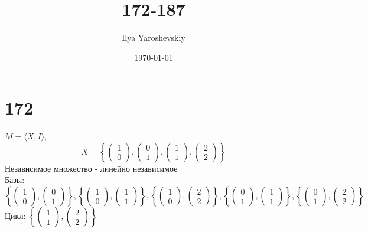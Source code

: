 \documentclass{article}
\author{Ilya Yaroshevskiy}
\date{\today}
\title{172-187}
\begin{document}
\maketitle
\tableofcontents


\section*{172}
\label{sec:org7d0c58a}
\(M = \langle X, I \rangle\), 
$$X = \left\{{\begin{pmatrix} 1 \\ 0 \end{pmatrix}}
, \begin{pmatrix} 0 \\ 1 \end{pmatrix}, \begin{pmatrix} 1 \\ 1 \end{pmatrix}
, \begin{pmatrix} 2 \\ 2 \end{pmatrix}\right\}$$
Независимое множество - линейно независимое  \\
Базы: $$
\left\{\begin{pmatrix} 1 \\ 0 \end{pmatrix}, \begin{pmatrix} 0 \\ 1 \end{pmatrix}\right\}, 
\left\{\begin{pmatrix} 1 \\ 0 \end{pmatrix}, \begin{pmatrix} 1 \\ 1 \end{pmatrix}\right\},
\left\{\begin{pmatrix} 1 \\ 0 \end{pmatrix}, \begin{pmatrix} 2 \\ 2 \end{pmatrix}\right\},
\left\{\begin{pmatrix} 0 \\ 1 \end{pmatrix}, \begin{pmatrix} 1 \\ 1 \end{pmatrix}\right\},
\left\{\begin{pmatrix} 0 \\ 1 \end{pmatrix}, \begin{pmatrix} 2 \\ 2 \end{pmatrix}\right\}
$$
Цикл: \(\left\{\begin{pmatrix} 1 \\ 1 \end{pmatrix}, \begin{pmatrix} 2 \\ 2 \end{pmatrix}\right\}\)
\end{document}
